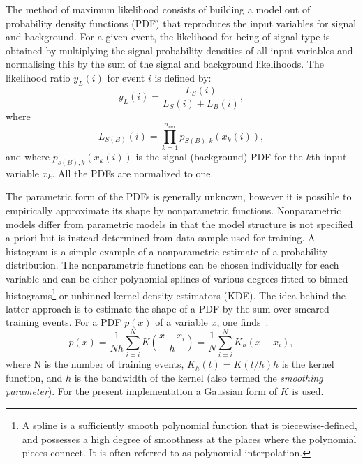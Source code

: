 The method of maximum likelihood consists of building a model out of probability density functions (PDF) that reproduces the input variables for signal and background. For a given event, the likelihood for being of signal type is obtained by multiplying the signal probability densities of all input variables %
and normalising this by the sum of the signal and background likelihoods. %
The likelihood ratio $y_{L}(i)$ for event $i$ is defined by:
%
\begin{equation}
y_{L}(i) = \frac{L_S(i)}{L_S(i)+L_B(i)},
\end{equation}
%
where
%
\begin{equation}
L_{S(B)}(i) = \prod^{n_{var}}_{k=1}  p_{S(B),k}(x_k(i)),
\end{equation}
%
and where $p_{s(B),k}(x_k(i))$ is the signal (background) PDF for the $k$th input variable $x_k$. All the PDFs are normalized to one. 

The parametric form of the PDFs is generally unknown, however it is possible to empirically approximate its shape %
by nonparametric functions. Nonparametric models differ from parametric models in that the model structure is not specified a priori but is instead determined from data sample used for training.  A histogram is a simple example of a nonparametric estimate of a probability distribution.   The nonparametric functions can be chosen individually for each variable and can be either polynomial splines of various degrees fitted to binned histograms\footnote{A spline is a sufficiently smooth polynomial function that is piecewise-defined, and possesses a high degree of smoothness at the places where the polynomial pieces connect. It is often referred to as polynomial interpolation. } or unbinned kernel density estimators (KDE). The idea behind the latter approach is to estimate the shape of a PDF by the sum over smeared training events. For a PDF $p(x)$ of a variable $x$, one finds~\cite{KDE}. 
%
\begin{equation}
p(x) = \frac{1}{N h} \sum^N_{i=i} K(\frac{x-x_i}{h}) = \frac{1}{N} \sum^N_{i=i} K_h(x-x_i),
\end{equation}
%
where N is the number of training events, $K_h(t) = K(t/h)h$ is the kernel function, and $h$ is the bandwidth of the kernel (also termed the \emph{smoothing parameter}). For the present implementation a Gaussian form of $K$ is used.  

